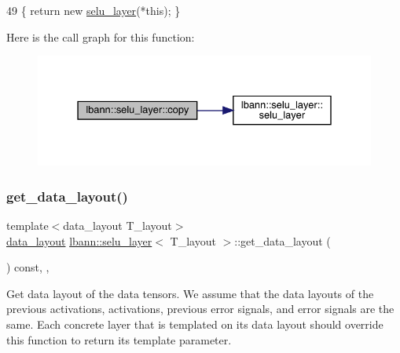 \begin{DoxyCode}
49 \{ \textcolor{keywordflow}{return} \textcolor{keyword}{new} \hyperlink{classlbann_1_1selu__layer_ad71a99f25ddf2c07bc082a8e08f12cc2}{selu\_layer}(*\textcolor{keyword}{this}); \}
\end{DoxyCode}
Here is the call graph for this function\+:\nopagebreak
\begin{figure}[H]
\begin{center}
\leavevmode
\includegraphics[width=331pt]{classlbann_1_1selu__layer_a93b696880571fad03f9aa142153117fa_cgraph}
\end{center}
\end{figure}
\mbox{\label{classlbann_1_1selu__layer_a02a03e8f426406619e48258f71feffd1}} 
\subsubsection{\texorpdfstring{get\+\_\+data\+\_\+layout()}{get\_data\_layout()}}
{\footnotesize\ttfamily template$<$data\+\_\+layout T\+\_\+layout$>$ \\
\hyperlink{base_8hpp_a786677cbfb3f5677b4d84f3056eb08db}{data\+\_\+layout} \hyperlink{classlbann_1_1selu__layer}{lbann\+::selu\+\_\+layer}$<$ T\+\_\+layout $>$\+::get\+\_\+data\+\_\+layout (\begin{DoxyParamCaption}{ }\end{DoxyParamCaption}) const\hspace{0.3cm}{\ttfamily [inline]}, {\ttfamily [override]}, {\ttfamily [virtual]}}

Get data layout of the data tensors. We assume that the data layouts of the previous activations, activations, previous error signals, and error signals are the same. Each concrete layer that is templated on its data layout should override this function to return its template parameter. 

